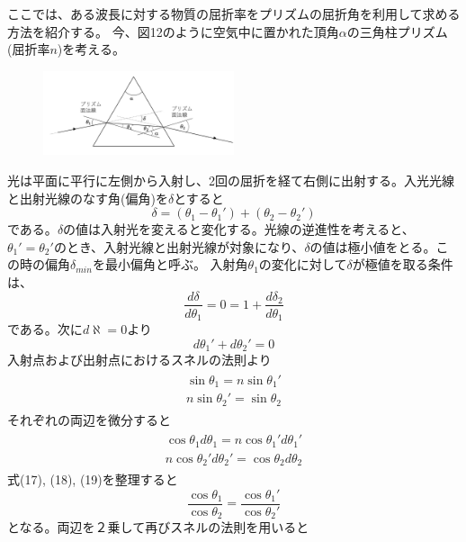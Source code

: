 \documentclass[a4paper,10pt]{jsarticle}
\begin{document}
ここでは、ある波長に対する物質の屈折率をプリズムの屈折角を利用して求める方法を紹介する。
今、図12のように空気中に置かれた頂角$\alpha$の三角柱プリズム(屈折率$n$)を考える。
\begin{figure}[H]
  \centering
  \includegraphics[width=0.5\textwidth]{figs/prism_figure.pdf}
\end{figure}
光は平面に平行に左側から入射し、2回の屈折を経て右側に出射する。入光光線と出射光線のなす角(偏角)を$\delta$とすると
\begin{equation}
  \delta = (\theta_1 - \theta_1') + (\theta_2 - \theta_2')
\end{equation}
である。$\delta$の値は入射光を変えると変化する。光線の逆進性を考えると、$\theta_1'=\theta_2'$のとき、入射光線と出射光線が対象になり、$\delta$の値は極小値をとる。この時の偏角$\delta_{min}$を最小偏角と呼ぶ。
入射角$\theta_1$の変化に対して$\delta$が極値を取る条件は、
\begin{equation}
  \frac{d\delta}{d\theta_1} = 0 = 1 + \frac{d\delta_2}{d\theta_1}
\end{equation}
である。次に$d\aleph=0$より
\begin{equation}
  d\theta_1' + d\theta_2' = 0
\end{equation}
入射点および出射点におけるスネルの法則より
\begin{align}
  \begin{split}
  \sin\theta_1 = n\sin\theta_1' \\
  n\sin\theta_2' = \sin\theta_2
  \end{split}
\end{align}
それぞれの両辺を微分すると
\begin{align}
  \begin{split}
  \cos\theta_1 d\theta_1 = n\cos\theta_1'd\theta_1' \\
  n\cos\theta_2'd\theta_2' = \cos\theta_2 d\theta_2
  \end{split}
\end{align}
式(17), (18), (19)を整理すると
\begin{equation}
  \frac{\cos{\theta_1}}{\cos{\theta_2}} = \frac{\cos{\theta_1'}}{\cos{\theta_2'}}
\end{equation}
となる。両辺を２乗して再びスネルの法則を用いると
\end{document}
